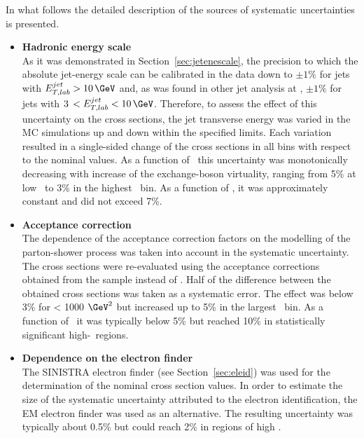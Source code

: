 In what follows the detailed description of the sources of systematic uncertainties is presented.
\begin{itemize}
	\item \textbf{Hadronic energy scale} \\
		As it was demonstrated in Section~\ref{sec:jetenescale}, the precision to which the absolute jet-energy scale can be calibrated in the data down to $\pm1\%$ for jets with $\etjetlab > 10\,\GeV$ and, as was found in other jet analysis at \zeus, $\pm1\%$ for jets with $3\,< \etjetlab < 10\,\GeV$. Therefore, to assess the effect of this uncertainty on the cross sections, the jet transverse energy was varied in the MC simulations up and down within the specified limits. Each variation resulted in a single-sided change of the cross sections in all bins with respect to the nominal values. As a function of \qsq~this uncertainty was monotonically decreasing with increase of the exchange-boson virtuality, ranging from 5\% at low \qsq~to 3\% in the highest \qsq~bin. As a function of \etjetb, it was approximately constant and did not exceed 7\%.
		
	\item \textbf{Acceptance correction} \\
		The dependence of the acceptance correction factors on the modelling of the parton-shower process was taken into account in the systematic uncertainty. The cross sections were re-evaluated using the acceptance corrections obtained from the \ariadne sample instead of \lepto. Half of the difference between the obtained cross sections was taken as a systematic error. The effect was below 3\% for \qsq < 1000 $\GeV^2$ but increased up to 5\% in the largest \qsq~bin. As a function of \etjetb~it was typically below 5\% but reached 10\% in statistically significant high-\etjetb~regions.
			
	\item \textbf{Dependence on the electron finder}\\
		The \textsc{SINISTRA} electron finder (see Section~\ref{sec:eleid}) was used for the determination of the nominal cross section values. In order to estimate the size of the systematic uncertainty attributed to the electron identification, the \textsc{EM} electron finder was used as an alternative. The resulting uncertainty was typically about 0.5\% but could reach 2\% in regions of high \qsq.
	

\end{itemize}
